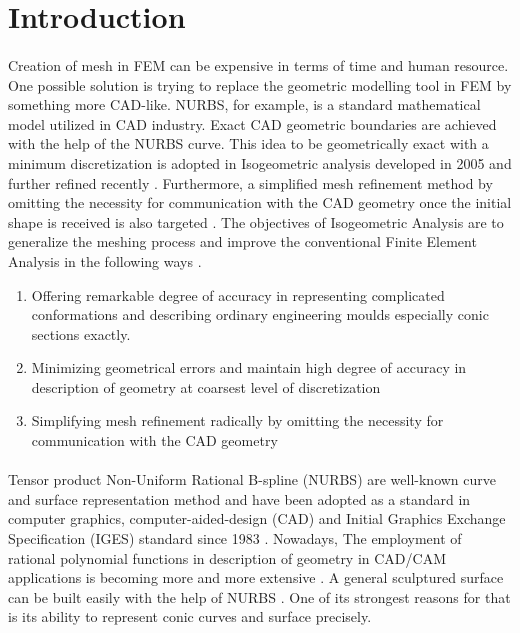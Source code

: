 
\section{Introduction}
\paragraph{}
Creation of mesh in FEM can be expensive in terms of time and human resource.
One possible solution is trying to replace the geometric modelling tool in FEM by something more CAD-like.
NURBS, for example, is a standard mathematical model utilized in CAD industry.
Exact CAD geometric boundaries are achieved with the help of the NURBS curve.
This idea to be geometrically exact with a minimum discretization is adopted in Isogeometric analysis developed in 2005 \cite{Hug2005b} and further refined recently \cite{Zhang2007,Hug2005b,Cot2006,Cot2009,Baz2006a,Baz2006b}.
Furthermore, a simplified mesh refinement method by omitting the necessity for communication with the CAD geometry once the initial shape is received is also targeted \cite{Cot2007}.
The objectives of Isogeometric Analysis are to generalize the meshing process and improve the conventional Finite Element Analysis in the following ways \cite{Aur2010}.
\begin{enumerate}
    \item Offering remarkable degree of accuracy in representing complicated conformations and describing ordinary engineering moulds especially conic sections exactly.
    \item Minimizing geometrical errors and maintain high degree of accuracy in description of geometry at coarsest level of discretization
    \item Simplifying mesh refinement radically by omitting the necessity for communication with the CAD geometry
\end{enumerate}

\paragraph{}
Tensor product Non-Uniform Rational B-spline (NURBS) are well-known curve and surface representation method and have been adopted as a standard in computer graphics, computer-aided-design (CAD) \cite{Nas2003} and Initial Graphics Exchange Specification (IGES) standard since 1983 \cite{IGES1983}.
Nowadays, The employment of rational polynomial functions in description of geometry in CAD/CAM applications is becoming more and more extensive \cite{Pie1987}.
A general sculptured surface can be built easily with the help of NURBS \cite{Rog2001}.
One of its strongest reasons for that is its ability to represent conic curves and surface precisely.


